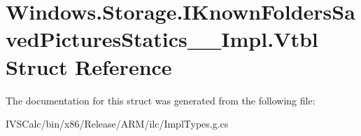 \hypertarget{struct_windows_1_1_storage_1_1_i_known_folders_saved_pictures_statics_____impl_1_1_vtbl}{}\section{Windows.\+Storage.\+I\+Known\+Folders\+Saved\+Pictures\+Statics\+\_\+\+\_\+\+Impl.\+Vtbl Struct Reference}
\label{struct_windows_1_1_storage_1_1_i_known_folders_saved_pictures_statics_____impl_1_1_vtbl}


The documentation for this struct was generated from the following file\+:\begin{DoxyCompactItemize}
\item 
I\+V\+S\+Calc/bin/x86/\+Release/\+A\+R\+M/ilc/Impl\+Types.\+g.\+cs\end{DoxyCompactItemize}
